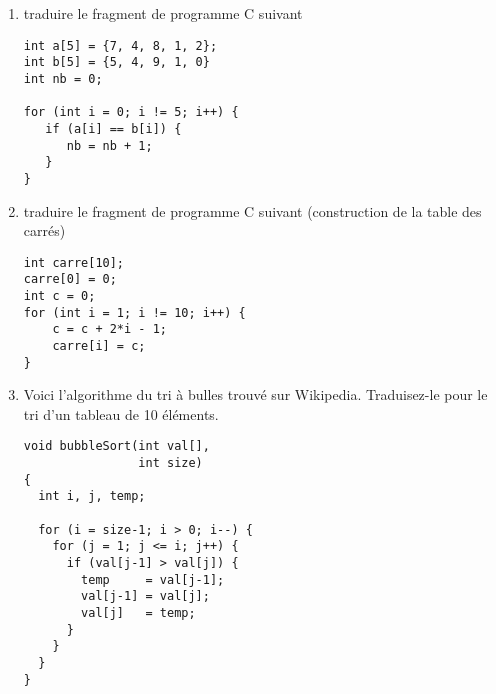 \documentclass[10pt]{article}
\begin{document}
\begin{multicols*}{2}
\begin{enumerate}
 \item traduire le fragment de programme C suivant
\begin{lstlisting}[frame=single]
int a[5] = {7, 4, 8, 1, 2};
int b[5] = {5, 4, 9, 1, 0}
int nb = 0;

for (int i = 0; i != 5; i++) {
   if (a[i] == b[i]) {
      nb = nb + 1;
   }
}
\end{lstlisting}
  \item traduire le fragment de programme C suivant
(construction de la table des carrés)
\begin{lstlisting}[frame=single]
int carre[10];
carre[0] = 0;
int c = 0;
for (int i = 1; i != 10; i++) {
    c = c + 2*i - 1;
    carre[i] = c;
}   
\end{lstlisting}

\item Voici l'algorithme du tri à bulles
trouvé sur Wikipedia. Traduisez-le pour le tri d'un tableau de 10
éléments.
\begin{lstlisting}[frame=single]
void bubbleSort(int val[], 
                int size)
{
  int i, j, temp;
 
  for (i = size-1; i > 0; i--) {
    for (j = 1; j <= i; j++) {
      if (val[j-1] > val[j]) {
        temp     = val[j-1];
        val[j-1] = val[j];
        val[j]   = temp;
      }
    }
  }
}
\end{lstlisting}
\end{enumerate}

\end{multicols*}
 
\end{document}
